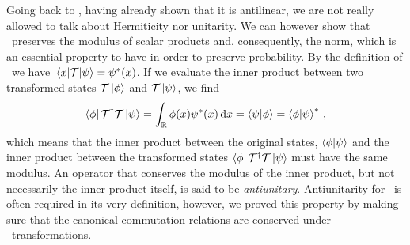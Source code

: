         Going back to \hT, having already shown that it is antilinear, we are not really allowed to talk about Hermiticity nor unitarity. We can however show that \hT\ preserves the modulus of scalar products and, consequently, the norm, which is an essential property to have in order to preserve probability. By the definition of \hT\ we have $\mel{x}{\hT}{\psi} = \psi^*\pqty{x}$. If we evaluate the inner product between two transformed states $\mathcal{{T}}\ket{\phi}$ and $\mathcal{{T}}\ket{\psi}$, we find
        \begin{equation*}
            \bra{\phi}\hT^\dag\hT\ket{\psi}
            = \int\nolimits_\bbR \phi\pqty{x}\psi^*\pqty{x}\dd{x}
            = \bra{\psi}\ket{\phi}
            = \bra{\phi}\ket{\psi}^*
            \mycomma
        \end{equation*}
        which means that the inner product between the original states, $\braket{\phi}{\psi}$ and the inner product between the transformed states $\bra{\phi}\mathcal{{T}}^\dag\mathcal{{T}}\ket{\psi}$ must have the same modulus. An operator that conserves the modulus of the inner product, but not necessarily the inner product itself, is said to be \emph{antiunitary}. Antiunitarity for \hT\ is often required in its very definition, however, we proved this property by making sure that the canonical commutation relations are conserved under \mcT\ transformations.
        
